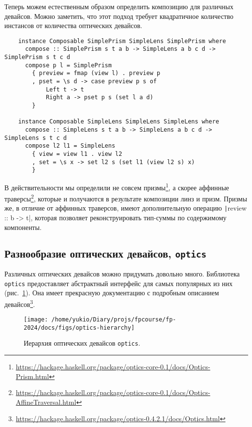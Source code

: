 Теперь можем естественным образом определить композицию для различных девайсов.
Можно заметить, что этот подход требует квадратичное количество инстансов от количества оптических девайсов.

\begin{verbatim}
    instance Composable SimplePrism SimpleLens SimplePrism where
      compose :: SimplePrism s t a b -> SimpleLens a b c d -> SimplePrism s t c d
      compose p l = SimplePrism
        { preview = fmap (view l) . preview p
        , pset = \s d -> case preview p s of
            Left t -> t
            Right a -> pset p s (set l a d)
        }

    instance Composable SimpleLens SimpleLens SimpleLens where
      compose :: SimpleLens s t a b -> SimpleLens a b c d -> SimpleLens s t c d
      compose l2 l1 = SimpleLens
        { view = view l1 . view l2
        , set = \s x -> set l2 s (set l1 (view l2 s) x)
        }
\end{verbatim}

В действительности мы определили не совсем призмы\footnote{\url{https://hackage.haskell.org/package/optics-core-0.1/docs/Optics-Prism.html}}, а скорее аффинные траверсы\footnote{\url{https://hackage.haskell.org/package/optics-core-0.1/docs/Optics-AffineTraversal.html}}, которые и получаются в результате композиции линз и призм.
Призмы же, в отличие от аффинных траверсов, имеют дополнительную операцию \texttt|review :: b -> t|, которая позволяет реконструировать тип-суммы по содержимому компоненты.

\subsection{Разнообразие оптических девайсов, \texttt{optics}} \label{subsec:optics}

Различных оптических девайсов можно придумать довольно много.
Библиотека \texttt{optics} предоставляет абстрактный интерфейс для самых популярных из них (рис.~\ref{fig:optics-hierarchy}).
Она имеет прекрасную документацию с подробным описанием девайсов\footnote{\url{https://hackage.haskell.org/package/optics-0.4.2.1/docs/Optics.html}}.

\begin{figure}
    \centering
    \texttt{[image: /home/yukio/Diary/projs/fpcourse/fp-2024/docs/figs/optics-hierarchy]}
    \caption{Иерархия оптических девайсов \texttt{optics}.}
    \label{fig:optics-hierarchy}
\end{figure}

